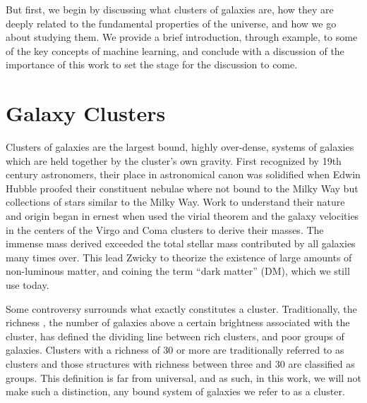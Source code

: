 But first, we begin by discussing what clusters of galaxies are, how they are deeply related to the fundamental properties of the universe, and how we go about studying them. We provide a brief introduction, through example, to some of the key concepts of machine learning, and conclude with a discussion of the importance of this work to set the stage for the discussion to come.

\section{Galaxy Clusters}
Clusters of galaxies are the largest bound, highly over-dense, systems of galaxies which are held together by the cluster's own gravity. First recognized by 19th century astronomers, their place in astronomical canon was solidified when Edwin Hubble proofed their constituent nebulae where not bound to the Milky Way \citep{Hubble1926} but collections of stars similar to the Milky Way. Work to understand their nature and origin began in ernest when \cite{Hubble1931} used the virial theorem and the galaxy velocities in the centers of the Virgo \citep{Smith1936} and Coma \citep{Zwicky1933} clusters to derive their masses. The immense mass derived exceeded the total stellar mass contributed by all galaxies many times over. This lead Zwicky to theorize the existence of large amounts of non-luminous matter, and coining the term ``dark matter'' (DM), which we still use today.  

Some controversy surrounds what exactly constitutes a cluster. Traditionally, the richness \citep{Abell1958}, the number of galaxies above a certain brightness associated with the cluster, has defined the dividing line between rich clusters, and poor groups of galaxies. Clusters with a richness of 30 or more are traditionally referred to as clusters and those structures with richness between three and 30 are classified as groups. This definition is far from universal, and as such, in this work, we will not make such a distinction, any bound system of galaxies we refer to as a cluster.

